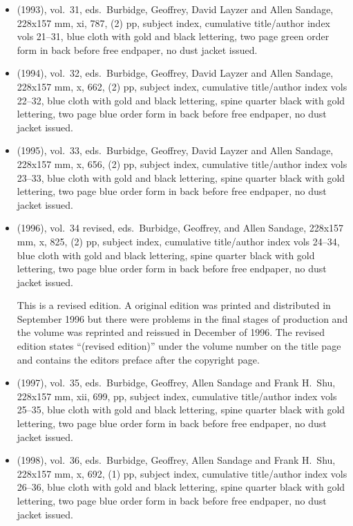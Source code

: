 \begin{itemize}
	\item (1993), vol.\ 31, eds.\ Burbidge, Geoffrey, David Layzer and Allen Sandage, 228x157 mm,
	xi, 787, (2) pp, subject index, cumulative title/author index vols 21--31,
	blue cloth with gold and black lettering,
	two page green order form in back before free endpaper, no dust jacket issued.
	
	\item (1994), vol.\ 32, eds.\ Burbidge, Geoffrey, David Layzer and Allen Sandage, 228x157 mm,
	x, 662, (2) pp, subject index, cumulative title/author index vols 22--32,
	blue cloth with gold and black lettering, spine quarter black with gold lettering,
	two page blue order form in back before free endpaper, no dust jacket	issued.
	
	\item (1995), vol.\ 33, eds.\ Burbidge, Geoffrey, David Layzer and Allen Sandage, 228x157 mm,
	x, 656, (2) pp, subject index, cumulative title/author index vols 23--33,
	blue cloth with gold and black lettering, spine quarter black with gold lettering,
	two page blue order form in back before free endpaper, no dust jacket issued.
	
	\item (1996), vol.\ 34 revised, eds.\ Burbidge, Geoffrey, and Allen Sandage, 228x157 mm,
	x, 825, (2) pp, subject index, cumulative title/author index vols 24--34,
	blue cloth with gold and black lettering, spine quarter black with gold lettering,
	two page blue order form in back before free endpaper, no dust jacket issued.
	
	This is a revised edition.  A original edition was printed and distributed in September 1996
	but there were problems in the final stages of production and the volume was reprinted and
	reissued in December of 1996.  The revised edition states ``(revised edition)'' under the
	volume number on the title page and contains the editors preface after the copyright page.
	
	\item (1997), vol.\ 35, eds.\ Burbidge, Geoffrey, Allen Sandage and Frank H.\ Shu, 228x157 mm,
	xii, 699, pp, subject index, cumulative title/author index vols 25--35,
	blue cloth with gold and black lettering, spine quarter black with gold lettering,
	two page blue order form in back before free endpaper, no dust jacket	issued.
	
	\item (1998), vol.\ 36, eds.\ Burbidge, Geoffrey, Allen Sandage and Frank H.\ Shu, 228x157 mm,
	x, 692, (1) pp, subject index, cumulative title/author index vols 26--36,
	blue cloth with gold and black lettering, spine quarter black with gold lettering,
	two page blue order form in back before free endpaper, no dust jacket	issued.
	

\end{itemize}
